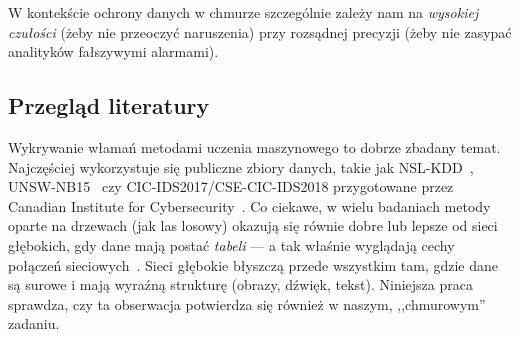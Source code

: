 W kontekście ochrony danych w chmurze szczególnie zależy nam na \emph{wysokiej
czułości} (żeby nie przeoczyć naruszenia) przy rozsądnej precyzji (żeby nie
zasypać analityków fałszywymi alarmami).

\subsection{Przegląd literatury}

Wykrywanie włamań metodami uczenia maszynowego to dobrze zbadany temat.
Najczęściej wykorzystuje się publiczne zbiory danych, takie jak
NSL-KDD~\cite{tavallaee2009detailed}, UNSW-NB15~\cite{moustafa2015unsw} czy
CIC-IDS2017/CSE-CIC-IDS2018 przygotowane przez Canadian Institute for
Cybersecurity~\cite{sharafaldin2018toward}. Co ciekawe, w wielu badaniach metody
oparte na drzewach (jak las losowy) okazują się równie dobre lub lepsze od sieci
głębokich, gdy dane mają postać \emph{tabeli} --- a tak właśnie wyglądają cechy
połączeń sieciowych~\cite{grinsztajn2022why}. Sieci głębokie błyszczą przede
wszystkim tam, gdzie dane są surowe i mają wyraźną strukturę (obrazy, dźwięk,
tekst). Niniejsza praca sprawdza, czy ta obserwacja potwierdza się również w
naszym, ,,chmurowym'' zadaniu.
